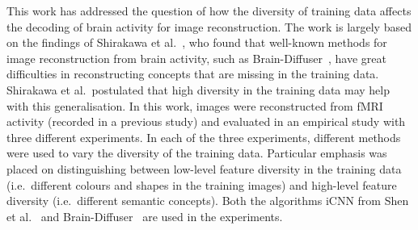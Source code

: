 This work has addressed the question of how the diversity of training data affects the decoding of brain activity for image reconstruction. The work is largely based on the findings of Shirakawa et al.~\cite{shirakawaSpuriousReconstructionBrain2024}, who found that well-known methods for image reconstruction from brain activity, such as Brain-Diffuser~\cite{ozcelikNaturalSceneReconstruction2023}, have great difficulties in reconstructing concepts that are missing in the training data. Shirakawa et al.\ postulated that high diversity in the training data may help with this generalisation. In this work, images were reconstructed from fMRI activity (recorded in a previous study)  and evaluated in an empirical study with three different experiments. In each of the three experiments, different methods were used to vary the diversity of the training data. Particular emphasis was placed on distinguishing between low-level feature diversity in the training data (i.e.\ different colours and shapes in the training images) and high-level feature diversity (i.e.\ different semantic concepts). Both the algorithms iCNN from Shen et al.~\cite{shenDeepImageReconstruction2019} and Brain-Diffuser~\cite{ozcelikNaturalSceneReconstruction2023} are used in the experiments.


